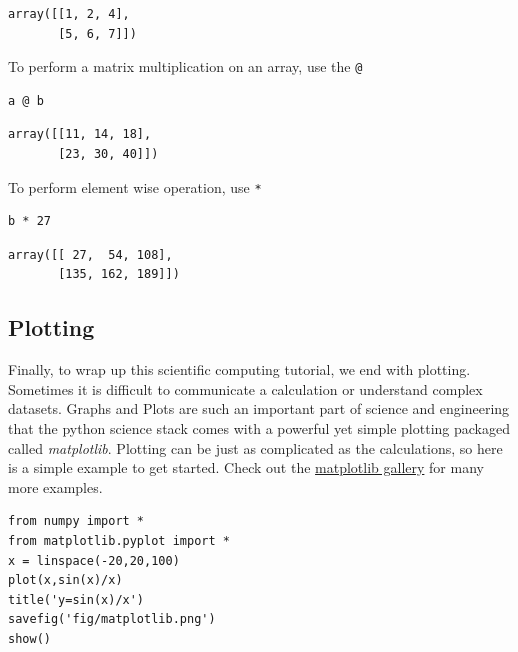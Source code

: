 \documentclass[%
oneside,                 %
final,                   %
10pt]{article}
\begin{document}
\begin{verbatim}
array([[1, 2, 4],
       [5, 6, 7]])
\end{verbatim}

To perform a matrix multiplication on an array, use the \texttt{@}

\begin{verbatim}
a @ b
\end{verbatim}

\begin{verbatim}
array([[11, 14, 18],
       [23, 30, 40]])
\end{verbatim}

To perform element wise operation, use \texttt{*}

\begin{verbatim}
b * 27
\end{verbatim}

\begin{verbatim}
array([[ 27,  54, 108],
       [135, 162, 189]])
\end{verbatim}


\subsection{Plotting}

Finally, to wrap up this scientific computing tutorial, we end with plotting. Sometimes it is difficult to communicate a calculation or understand complex datasets. Graphs and Plots are such an important part of science and engineering that the python science stack comes with a powerful yet simple plotting packaged called \emph{matplotlib}. Plotting can be just as complicated as the calculations, so here is a simple example to get started. Check out the \href{{http://matplotlib.org/gallery.html}}{matplotlib gallery} for many more examples.

\begin{verbatim}
from numpy import *
from matplotlib.pyplot import *
x = linspace(-20,20,100)
plot(x,sin(x)/x)
title('y=sin(x)/x')
savefig('fig/matplotlib.png')
show()
\end{verbatim}
\end{document}

